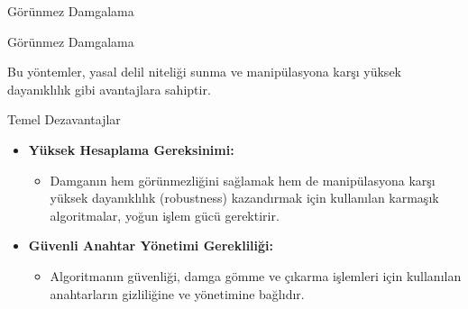\documentclass[aspectratio=169,xcolor={dvipsnames}]{beamer}
\begin{document}
\begin{frame}{Görünmez Damgalama}

\begin{block}{Görünmez Damgalama}

        Bu yöntemler, yasal delil niteliği sunma ve manipülasyona karşı yüksek dayanıklılık gibi avantajlara sahiptir.

\end{block}

    \begin{block}{Temel Dezavantajlar}
        \begin{itemize}
            \item \textbf{Yüksek Hesaplama Gereksinimi:}
                \begin{itemize}
                    \item Damganın hem görünmezliğini sağlamak hem de manipülasyona karşı yüksek dayanıklılık (robustness) kazandırmak için kullanılan karmaşık algoritmalar, yoğun işlem gücü gerektirir.
                \end{itemize}
            
            
            \item \textbf{Güvenli Anahtar Yönetimi Gerekliliği:}
                \begin{itemize}
                    \item Algoritmanın güvenliği, damga gömme ve çıkarma işlemleri için kullanılan anahtarların gizliliğine ve yönetimine bağlıdır.
                \end{itemize}
        \end{itemize}
    \end{block}
    


\end{frame}
\end{document}
